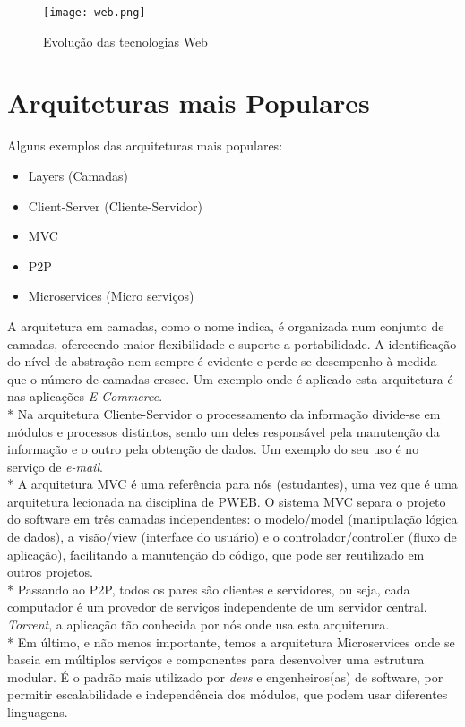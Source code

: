 \begin{figure}[H]
\center
\texttt{[image: web.png]}
\caption{Evolução das tecnologias Web}
\end{figure}



\section{Arquiteturas mais Populares}
Alguns exemplos das arquiteturas mais populares:
\begin{itemize}
    \item Layers (Camadas)
    \item Client-Server (Cliente-Servidor)
    \item \ac{MVC}
    \item \ac{P2P}
    \item Microservices (Micro serviços)
\end{itemize}

A arquitetura em camadas, como o nome indica, é organizada num conjunto de camadas, oferecendo maior flexibilidade e suporte a portabilidade. A identificação do nível de abstração nem sempre é evidente e perde-se desempenho à medida que o número de camadas cresce. Um exemplo onde é aplicado esta arquitetura é nas aplicações \textit{E-Commerce}.\\*
\indent Na arquitetura Cliente-Servidor o processamento da informação divide-se em módulos e processos distintos, sendo um deles responsável pela manutenção da informação e o outro pela obtenção de dados. Um exemplo do seu uso é no serviço de \textit{e-mail}.\\*
\indent A arquitetura \ac{MVC} é uma referência para nós (estudantes), uma vez que é uma arquitetura lecionada na disciplina de \ac{PWEB}. O sistema \ac{MVC} separa o projeto do software em três camadas independentes: o modelo/model (manipulação lógica de dados), a visão/view (interface do usuário) e o controlador/controller (fluxo de aplicação), facilitando a manutenção do código, que pode ser reutilizado em outros projetos.\\*
\indent Passando ao \ac{P2P}, todos os pares são clientes e servidores, ou seja, cada computador é um provedor de serviços independente de um servidor central. \textit{Torrent}, a aplicação tão conhecida por nós onde usa esta arquiterura.\\*
\indent Em último, e não menos importante, temos a arquitetura Microservices onde se baseia em múltiplos serviços e componentes para desenvolver uma estrutura modular. É o padrão mais utilizado por \textit{devs} e engenheiros(as) de software, por permitir escalabilidade e independência dos módulos, que podem usar diferentes linguagens.


